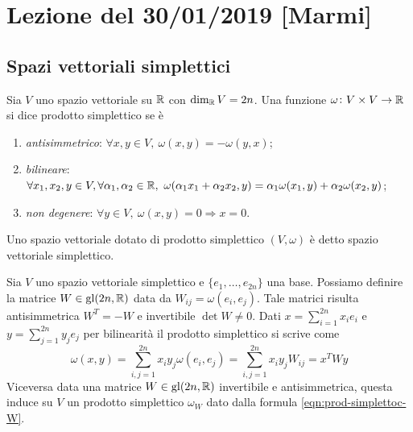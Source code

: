 \section{Lezione del 30/01/2019 [Marmi]}

\subsection{Spazi vettoriali simplettici}

\begin{definition}
    Sia $ V $ uno spazio vettoriale su $ \mathbb{R} $ con $ \dim_{\mathbb{R}} V = 2n $. Una funzione $ \omega \colon V \times V \to \mathbb{R} $ si dice prodotto simplettico se è
    \begin{enumerate}[label=(\roman*)]
        \item \emph{antisimmetrico}: $ \forall x, y \in V, \ \omega(x, y) = - \omega(y, x) $;
        \item \emph{bilineare}: $ \forall x_1, x_2, y \in V, \forall \alpha_1, \alpha_2 \in \mathbb{R}, \ \omega(\alpha_1 x_1 + \alpha_2 x_2, y) = \alpha_1 \omega(x_1, y) + \alpha_2 \omega(x_2, y) $;
        \item \emph{non degenere}: $ \forall y \in V, \ \omega(x, y) = 0 \Rightarrow x = 0 $.
    \end{enumerate}
    Uno spazio vettoriale dotato di prodotto simplettico $ (V, \omega) $ è detto spazio vettoriale simplettico.
\end{definition}

Sia $ V $ uno spazio vettoriale simplettico e $ \{e_1, \ldots, e_{2n}\} $ una base. Possiamo definire la matrice $ W \in \mathrm{gl}(2n, \mathbb{R}) $ data da $ W_{ij} = \omega(e_i, e_j) $. Tale matrici risulta antisimmetrica $ W^{T} = -W $ e invertibile $ \det{W} \neq 0 $. Dati $ x = \sum_{i=1}^{2n} x_i e_i $ e $ y = \sum_{j=1}^{2n} y_j e_j $ per bilinearità il prodotto simplettico si scrive come
\begin{equation} \label{eqn:prod-simplettoc-W}
    \omega(x, y) = \sum_{i, j=1}^{2n} x_i y_j \omega(e_i, e_j) = \sum_{i, j=1}^{2n} x_i y_j W_{ij} = x^T W y
\end{equation}
Viceversa data una matrice $ W \in \mathrm{gl}(2n, \mathbb{R}) $ invertibile e antisimmetrica, questa induce su $ V $ un prodotto simplettico $ \omega_W $ dato dalla formula \eqref{eqn:prod-simplettoc-W}. \\

